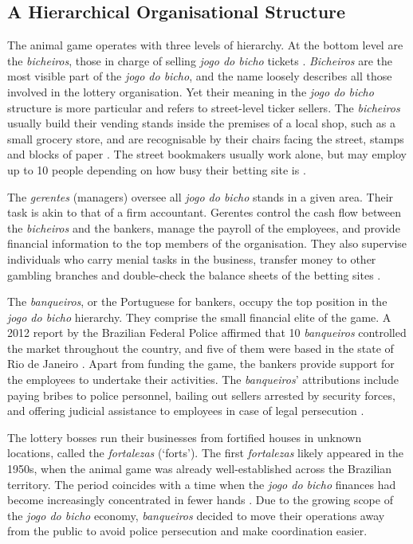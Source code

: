 \documentclass[a4paper,12pt]{article}
\begin{document}
\subsection{A Hierarchical Organisational Structure}%
\label{sub:organisation}

The animal game operates with three levels of hierarchy. At the bottom level are the \textit{bicheiros}, those in charge of selling \textit{jogo do bicho} tickets \citep{chazkel2007beyond, da1999aguias}. \textit{Bicheiros} are the most visible part of the \textit{jogo do bicho}, and the name loosely describes all those involved in the lottery organisation. Yet their meaning in the \textit{jogo do bicho} structure is more particular and refers to street-level ticker sellers. The \textit{bicheiros}  usually build their vending stands inside the premises of a local shop, such as a small grocery store, and are recognisable by their chairs facing the street, stamps and blocks of paper \citep[259]{chazkel2011laws}. The street bookmakers usually work alone, but may employ up to 10 people depending on how busy their betting site is \citep[69]{labronici2014sorteio}.

The \textit{gerentes} (managers) oversee all \textit{jogo do bicho} stands in a given area. Their task is akin to that of a firm accountant. Gerentes control the cash flow between the \textit{bicheiros} and the bankers, manage the payroll of the employees, and provide financial information to the top members of the organisation. They also supervise individuals who carry menial tasks in the business, transfer money to other gambling branches and double-check the balance sheets of the betting sites \citetext{\citealp[71]{labronici2012paratodos}; \citealp[142]{misse2007illegal}}.

The \textit{banqueiros}, or the Portuguese for bankers, occupy the top position in the \textit{jogo do bicho} hierarchy. They comprise the small financial elite of the game. A 2012 report by the Brazilian Federal Police affirmed that 10 \textit{banqueiros} controlled the market throughout the country, and five of them were based in the state of Rio de Janeiro \citep{globo2012contraventores}. Apart from funding the game, the bankers provide support for the employees to undertake their activities. The \textit{banqueiros}' attributions include paying bribes to police personnel, bailing out sellers arrested by security forces, and offering judicial assistance to employees in case of legal persecution \citep[75]{labronici2012paratodos}.

The lottery bosses run their businesses from fortified houses in unknown locations, called the \textit{fortalezas} (`forts'). The first \textit{fortalezas} likely appeared in the 1950s, when the animal game was already well-established across the Brazilian territory. The period coincides with a time when the \textit{jogo do bicho} finances had become increasingly concentrated in fewer hands \citep[259]{chazkel2011laws}. Due to the growing scope of the \textit{jogo do bicho} economy, \textit{banqueiros} decided to move their operations away from the public to avoid police persecution and make coordination easier. 
\end{document}

